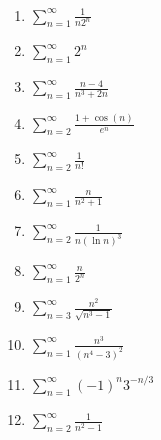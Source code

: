 \documentclass[11pt]{amsart}
\begin{document}
\begin{center}
  \large
  \\
   
\end{center}


\thispagestyle{empty}
%
\renewcommand{\labelenumi}{\textbf{\Alph{enumi}.}}
\begin{enumerate}
\setlength\itemsep{19mm}
\item   \qquad $\displaystyle \sum_{n=1}^\infty \frac{1}{n2^n}$
\vfill
\item   \qquad $\displaystyle \sum_{n=1}^\infty 2^{n}$
\vfill
\item   \qquad $\displaystyle \sum_{n=1}^\infty \frac{n-4}{n^3+2n}$
\vfill
\item   \qquad $\displaystyle \sum_{n=2}^\infty \frac{1+\cos(n)}{e^n}$
\vfill
\newpage
\item   \qquad $\displaystyle \sum_{n=2}^\infty \frac{1}{n!}$
\vfill

\item   \qquad $\displaystyle \sum_{n=1}^\infty \frac{n}{n^2+1}$
\vfill

\item   \qquad $\displaystyle \sum_{n=2}^\infty \frac{1}{n (\ln n)^3}$
\vfill
\newpage

\item   \qquad $\displaystyle \sum_{n=1}^\infty \frac{n}{2^n}$
\vfill
\item   \qquad $\displaystyle \sum_{n=3}^\infty \frac{n^2}{\sqrt{n^3-1}}$
\vfill
\item   \qquad $\displaystyle \sum_{n=1}^\infty \frac{n^3}{(n^4-3)^2}$
\vfill
\newpage
\item   \qquad $\displaystyle \sum_{n=1}^\infty (-1)^n 3^{-n/3}$
\vfill



\item   \qquad $\displaystyle \sum_{n=2}^\infty \frac{1}{n^2-1}$
\vfill
\newpage
\end{enumerate}
\end{document}
